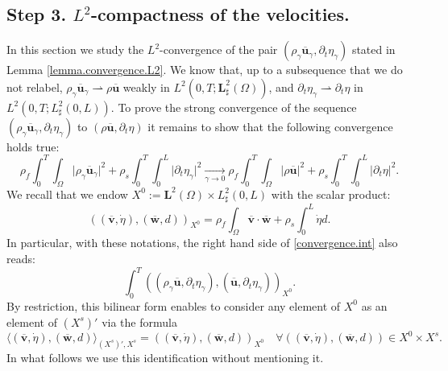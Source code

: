 \documentclass[JEP,XML,SOM,Unicode,NoFloatCountersInSection]{cedram}
\theoremstyle{remark}
\theoremstyle{definition}
\newcommand{\ug}{\boldsymbol{u}}
\newcommand{\vg}{\boldsymbol{v}}
\newcommand{\wg}{\boldsymbol{w}}
\newcommand{\BS}[1]{\boldsymbol{#1}}
\let\CM\Omega
\begin{document}
\subsection{Step 3. $L^2$-compactness of the velocities.}

In this section we study the $L^{2}$\nobreakdash-convergence of the pair $(\rho_{\gamma}\overline{\ug}_{\gamma},\partial_{t}\eta_{\gamma})$ stated in Lemma \ref{lemma.convergence.L2}.
We know that, up to a subsequence that we do not relabel, $\rho_{\gamma}\overline{\ug}_{\gamma}\rightharpoonup\rho\overline{\ug}$ weakly in $L^{2}(0,T;\BS{L}_\sharp^{2}(\CM))$, and $\partial_t\eta_\gamma \rightharpoonup \partial_{t}\eta$ in $L^2(0,T;L^2_{\sharp}(0,L))$. To prove the strong convergence of the sequence $(\rho_{\gamma}\overline{\ug}_{\gamma},\partial_{t}\eta_{\gamma})$ to $(\rho\overline{\ug},\partial_{t}\eta)$ it remains to show that the following convergence holds true:
\begin{equation}\label{convergence.int}
\rho_{f}\int_{0}^{T}\int_{\CM}\vert \rho_{\gamma}\overline{\ug}_{\gamma}\vert^{2}+\rho_{s}\int_{0}^{T}\int_{0}^{L}\vert\partial_{t}\eta_{\gamma}\vert^{2}\underset{\gamma\to 0}{\to}\rho_{f}\int_{0}^{T}\int_{\CM}\vert \rho\overline{\ug}\vert^{2}+\rho_{s}\int_{0}^{T}\int_{0}^{L}\vert\partial_{t}\eta\vert^{2}.
\end{equation}
We recall that we endow $X^0 := \mathbf{L}^2(\Omega) \times L^2_{\sharp}(0,L)$ with the scalar product:
\[
((\overline{\vg},\dot{\eta}), (\overline{\wg},d))_{X^0} = \rho_f \int_{\Omega} \overline{\vg} \cdot \overline{\wg} + \rho_s \int_{0}^L \dot{\eta} d.
\]
In particular, with these notations, the right hand side of \eqref{convergence.int} also reads:
\[
\int_0^T ((\rho_{\gamma}\overline{\ug},\partial_t \eta_{\gamma}), (\overline{\ug},\partial_t \eta_{\gamma}))_{X^0}.
\]
By restriction, this bilinear form enables to consider any element of $X^0$ as an element of $(X^s)'$ via the formula
\begin{equation} \label{eq:embedX0}
\langle (\overline{\vg},\dot{\eta}), (\overline{\wg},d) \rangle_{(X^s)',X^s } = ((\overline{\vg},\dot{\eta}), (\overline{\wg},d))_{X^0}
\quad \forall ((\overline{\vg},\dot{\eta}),(\overline{\wg},d)) \in X^0 \times X^s.
\end{equation}
In what follows we use this identification without mentioning it.
\end{document}
